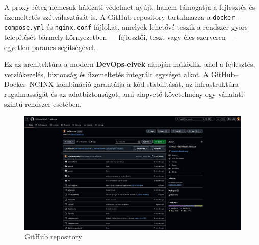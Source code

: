 A proxy réteg nemcsak hálózati védelmet nyújt, hanem támogatja a fejlesztés és üzemeltetés szétválasztását is.  
A GitHub repository tartalmazza a \texttt{docker-compose.yml} és \texttt{nginx.conf} fájlokat, amelyek lehetővé teszik a rendszer gyors telepítését bármely környezetben — fejlesztői, teszt vagy éles szerveren — egyetlen parancs segítségével.

Ez az architektúra a modern \textbf{DevOps-elvek} alapján működik, ahol a fejlesztés, verziókezelés, biztonság és üzemeltetés integrált egységet alkot.  
A GitHub–Docker–NGINX kombináció garantálja a kód stabilitását, az infrastruktúra rugalmasságát és az adatbiztonságot, ami alapvető követelmény egy vállalati szintű rendszer esetében.

\begin{figure}[H]
    \centering
    \includegraphics[width=150mm, keepaspectratio]{figures/github.jpg}
    \caption{GitHub repository}
    \label{fig:github}
\end{figure}

